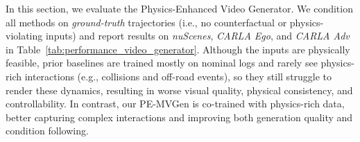 \documentclass[runningheads]{llncs}
\begin{document}
In this section, we evaluate the Physics-Enhanced Video Generator. We condition all methods on \emph{ground-truth} trajectories (i.e., no counterfactual or physics-violating inputs) and report results on \textit{nuScenes}, \textit{CARLA Ego}, and \textit{CARLA Adv} in Table~\ref{tab:performance_video_generator}. Although the inputs are physically feasible, prior baselines are trained mostly on nominal logs and rarely see physics-rich interactions (e.g., collisions and off-road events), so they still struggle to render these dynamics, resulting in worse visual quality, physical consistency, and controllability. In contrast, our PE-MVGen is co-trained with physics-rich data, better capturing complex interactions and improving both generation quality and condition following.

\end{document}
